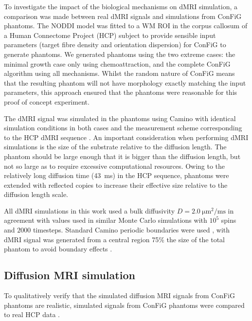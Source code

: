 To investigate the impact of the biological mechanisms on dMRI simulation, a comparison was made between real dMRI signals and simulations from ConFiG phantoms. The NODDI model \cite{Zhang2012} was fitted to a WM ROI in the corpus callosum of a Human Connectome Project (HCP) \cite{VanEssen2012} subject to provide sensible input parameters (target fibre density and orientation dispersion) for ConFiG to generate phantoms. We generated phantoms using the two extreme cases: the minimal growth case only using chemoattraction, and the complete ConFiG algorithm using all mechanisms. Whilst the random nature of ConFiG means that the resulting phantom will not have morphology exactly matching the input parameters, this approach ensured that the phantoms were reasonable for this proof of concept experiment.

The dMRI signal was simulated in the phantoms using Camino \cite{Cook2006,Hall2009} with identical simulation conditions in both cases and the measurement scheme corresponding to the HCP dMRI sequence \cite{Sotiropoulos2013a}. An important consideration when performing dMRI simulations is the size of the substrate relative to the diffusion length. The phantom should be large enough that it is bigger than the diffusion length, but not so large as to require excessive computational resources. Owing to the relatively long diffusion time (\SI{43}{\milli\second}) in the HCP sequence, phantoms were extended with reflected copies \cite{Lee2019a,Fieremans2018} to increase their effective size relative to the diffusion length scale.

All dMRI simulations in this work used a bulk diffusivity $D=\SI{2.0}{\micro\metre\squared\per\milli\second}$ in agreement with values used in similar Monte Carlo simulations \cite{Hall2009,Nilsson2009,Rensonnet2017} with $10^5$ spins and $2000$ timesteps. Standard Camino periodic boundaries were used \cite{Hall2009}, with dMRI signal was generated from a central region 75\% the size of the total phantom to avoid boundary effects \cite{Panagiotaki2010}.


\subsection{Diffusion MRI simulation}
\label{sec:config_diffusion_sim}
To qualitatively verify that the simulated diffusion MRI signals from ConFiG phantoms are realistic, simulated signals from ConFiG phantoms were compared to real HCP data \cite{Sotiropoulos2013a,VanEssen2012}.

